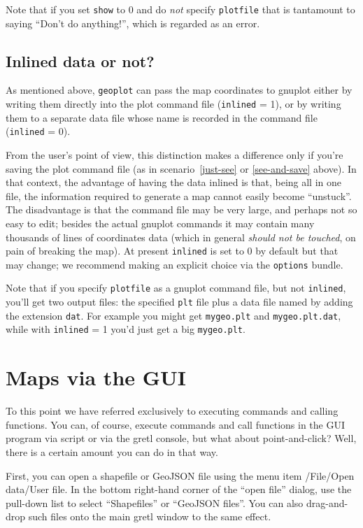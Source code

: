 \documentclass{article}
\begin{document}
Note that if you set \texttt{show} to 0 and do \textit{not} specify
\texttt{plotfile} that is tantamount to saying ``Don't do anything!'',
which is regarded as an error.

\subsection{Inlined data or not?}

As mentioned above, \texttt{geoplot} can pass the map coordinates to
\textsf{gnuplot} either by writing them directly into the plot command
file (\texttt{inlined} = 1), or by writing them to a separate data
file whose name is recorded in the command file (\texttt{inlined} =
0).

From the user's point of view, this distinction makes a difference
only if you're saving the plot command file (as in
scenario~\ref{just-see} or \ref{see-and-save} above).  In that
context, the advantage of having the data inlined is that, being all
in one file, the information required to generate a map cannot easily
become ``unstuck''. The disadvantage is that the command file may be
very large, and perhaps not so easy to edit; besides the actual
\textsf{gnuplot} commands it may contain many thousands of lines of
coordinates data (which in general \textit{should not be touched}, on
pain of breaking the map). At present \texttt{inlined} is set to
0 by default but that may change; we recommend making an explicit
choice via the \texttt{options} bundle.

Note that if you specify \texttt{plotfile} as a \textsf{gnuplot}
command file, but not \texttt{inlined}, you'll get two output files:
the specified \texttt{plt} file plus a data file named by adding the
extension \texttt{dat}. For example you might get \texttt{mygeo.plt}
and \texttt{mygeo.plt.dat}, while with \texttt{inlined} = 1 you'd just
get a big \texttt{mygeo.plt}.

\section{Maps via the GUI}
\label{sec:gui}

To this point we have referred exclusively to executing commands and
calling functions. You can, of course, execute commands and call
functions in the GUI program via script or via the gretl console, but
what about point-and-click? Well, there is a certain amount you can do
in that way.

First, you can open a shapefile or GeoJSON file using the menu item
\textsf{/File/Open data/User file}. In the bottom right-hand corner of
the ``open file'' dialog, use the pull-down list to select
``Shapefiles'' or ``GeoJSON files''. You can also drag-and-drop such
files onto the main gretl window to the same effect.
\end{document}
